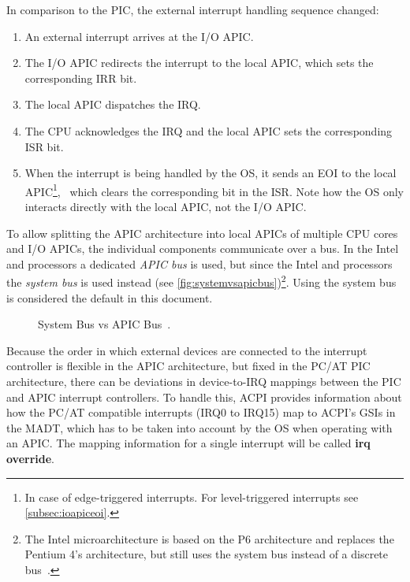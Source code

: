 In comparison to the PIC, the external interrupt handling sequence changed:

\begin{enumerate}
  \item An external interrupt arrives at the I/O APIC\@.
  \item The I/O APIC redirects the interrupt to the local APIC, which sets the corresponding IRR bit.
  \item The local APIC dispatches the IRQ\@.
  \item The CPU acknowledges the IRQ and the local APIC sets the corresponding ISR bit.
  \item When the interrupt is being handled by the OS, it sends an EOI to the local APIC\footnote{
          In case of edge-triggered interrupts. For level-triggered interrupts see \autoref{subsec:ioapiceoi}.},
        \ which clears the corresponding bit in the ISR\@.
        Note how the OS only interacts directly with the local APIC, not the I/O APIC.
\end{enumerate}

To allow splitting the APIC architecture into local APICs of multiple CPU cores and I/O APICs, the individual components communicate over a bus.
In the Intel  and  processors a dedicated \textit{APIC bus} is used, but since the Intel  and  processors the \textit{system bus} is used instead (see \autoref{fig:systemvsapicbus})\footnote{
  The Intel  microarchitecture is based on the P6 architecture and replaces the Pentium 4's  architecture, but still uses the system bus instead of a discrete bus~\autocite[sec.~3.11.2]{ia32}.}.
Using the system bus is considered the default in this document.

\begin{figure}[h]
  \centering
  \begin{subfigure}[b]{0.6\textwidth}
    
  \end{subfigure}
  \caption{System Bus vs APIC Bus~\autocite[sec.~3.11.1]{ia32}.}
  \label{fig:systemvsapicbus}
\end{figure}

Because the order in which external devices are connected to the interrupt controller is flexible in the APIC architecture, but fixed in the PC/AT PIC architecture, there can be deviations in device-to-IRQ mappings between the PIC and APIC interrupt controllers.
To handle this, ACPI provides information about how the PC/AT compatible interrupts (IRQ0 to IRQ15) map to ACPI's GSIs in the MADT, which has to be taken into account by the OS when operating with an APIC\@.
The mapping information for a single interrupt will be called \textbf{\gls{irq override}}.

